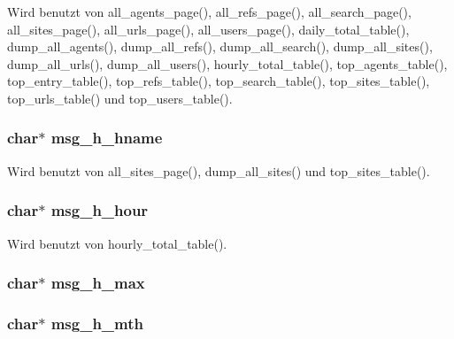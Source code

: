 Wird benutzt von all\_\-agents\_\-page(), all\_\-refs\_\-page(), all\_\-search\_\-page(), all\_\-sites\_\-page(), all\_\-urls\_\-page(), all\_\-users\_\-page(), daily\_\-total\_\-table(), dump\_\-all\_\-agents(), dump\_\-all\_\-refs(), dump\_\-all\_\-search(), dump\_\-all\_\-sites(), dump\_\-all\_\-urls(), dump\_\-all\_\-users(), hourly\_\-total\_\-table(), top\_\-agents\_\-table(), top\_\-entry\_\-table(), top\_\-refs\_\-table(), top\_\-search\_\-table(), top\_\-sites\_\-table(), top\_\-urls\_\-table() und top\_\-users\_\-table().
\subsubsection{\setlength{\rightskip}{0pt plus 5cm}char$\ast$ {\bf msg\_\-h\_\-hname}}\label{lang_8h_389648e11c07ae97a6c19e049401a01f}




Wird benutzt von all\_\-sites\_\-page(), dump\_\-all\_\-sites() und top\_\-sites\_\-table().
\subsubsection{\setlength{\rightskip}{0pt plus 5cm}char$\ast$ {\bf msg\_\-h\_\-hour}}\label{lang_8h_75d18a9846e48af78b39df85c88b425e}




Wird benutzt von hourly\_\-total\_\-table().
\subsubsection{\setlength{\rightskip}{0pt plus 5cm}char$\ast$ {\bf msg\_\-h\_\-max}}\label{lang_8h_081ce53502d2128996c22bef5bd24a53}


\subsubsection{\setlength{\rightskip}{0pt plus 5cm}char$\ast$ {\bf msg\_\-h\_\-mth}}\label{lang_8h_3f7e8b2df4f2e24306b823798e8ee780}


